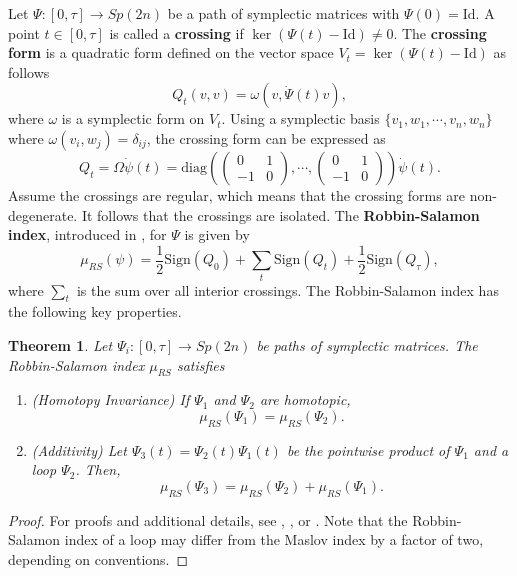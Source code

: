 \documentclass{amsart}
\renewcommand{\o}{\omega}
\newcommand{\Id}{\mathrm{Id}}
\newcommand{\Sign}{\mathrm{Sign}}
\newtheorem{thm}{Theorem}[section]
\begin{document}
Let $\Psi:[0,\tau]\to Sp(2n)$ be a path of symplectic matrices with $\Psi(0)=\Id$. A point $t\in [0,\tau]$ is called a \textbf{crossing} if $\ker(\Psi(t)-\Id)\neq0$. The \textbf{crossing form} is a quadratic form defined on the vector space $V_t = \ker(\Psi(t)-\Id)$ as follows
$$
Q_t(v,v) = \o(v,\dot{\Psi}(t)v),
$$
where $\o$ is a symplectic form on $V_t$.
Using a symplectic basis $\{v_1,w_1,\cdots,v_n,w_n\}$ where $\o(v_i,w_j)=\delta_{ij}$, the crossing form can be expressed as
$$
Q_t = \Omega\dot{\psi}(t) = 
\mathrm{diag}\left(
\begin{pmatrix}
	0&1\\
	-1&0
\end{pmatrix},
\cdots,
\begin{pmatrix}
	0&1\\
	-1&0
\end{pmatrix}
\right)
\dot{\psi}(t).
$$
Assume the crossings are regular, which means that the crossing forms are non-degenerate.
It follows that the crossings are isolated.
The \textbf{Robbin-Salamon index}, introduced in \cite{Robbin_Salamon_93}, for $\Psi$ is given by
$$
\mu_{RS}(\psi) = \frac{1}{2}\Sign(Q_0) + \sum_t \Sign(Q_t) + \frac{1}{2}\Sign(Q_\tau),
$$
where $\sum_t$ is the sum over all interior crossings.
The Robbin-Salamon index has the following key properties.
\begin{thm}\label{Theorem - RS index axiom}
	Let $\Psi_i:[0,\tau]\to Sp(2n)$ be paths of symplectic matrices.
	The Robbin-Salamon index $\mu_{RS}$ satisfies
	\begin{enumerate}
		\item (\rm{Homotopy Invariance}) If $\Psi_1$ and $\Psi_2$ are homotopic,
		$$\mu_{RS}(\Psi_1) = \mu_{RS}(\Psi_2).$$
		\item (\rm{Additivity}) Let $\Psi_3(t)=\Psi_2(t)\Psi_1(t)$ be the pointwise product of $\Psi_1$ and a loop $\Psi_2$.
		Then,
		$$
		\mu_{RS}(\Psi_3) = \mu_{RS}(\Psi_2)+\mu_{RS}(\Psi_1).
		$$
	\end{enumerate}
\end{thm}
\begin{proof}
	For proofs and additional details, see \cite{Salamon_Zehnder_92}, \cite{Robbin_Salamon_93}, or \cite{Salamon_99}.
	Note that the Robbin-Salamon index of a loop may differ from the Maslov index by a factor of two, depending on conventions.
\end{proof}
\end{document}
